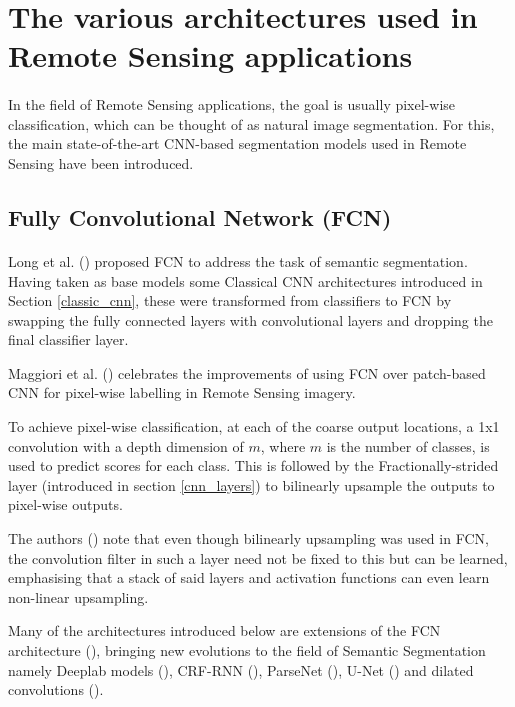 \section{The various architectures used in Remote Sensing applications} \label{seg_nets}
\paragraph{}
In the field of Remote Sensing applications, the goal is usually pixel-wise classification, which can be thought of as natural image segmentation. For this, the main state-of-the-art \gls{CNN}-based segmentation models used in Remote Sensing have been introduced.

\subsection{Fully Convolutional Network (FCN)} 
\paragraph{}
Long et al. (\cite{long2015fully}) proposed \gls{FCN} to address the task of semantic segmentation. Having taken as base models some Classical \gls{CNN} architectures introduced in Section \ref{classic_cnn}, these were transformed from classifiers to \gls{FCN} by swapping the fully connected layers with convolutional layers and dropping the final classifier layer. 

Maggiori et al. (\cite{7730322}) celebrates the improvements of using \gls{FCN} over patch-based \gls{CNN} for pixel-wise labelling in Remote Sensing imagery.

To achieve pixel-wise classification, at each of the coarse output locations, a 1x1 convolution with a depth dimension of $m$, where $m$ is the number of classes, is used to predict scores for each class. This is followed by the Fractionally-strided layer (introduced in section \ref{cnn_layers}) to bilinearly upsample the outputs to pixel-wise outputs. 

The authors (\cite{long2015fully}) note that even though bilinearly upsampling was used in \gls{FCN}, the convolution filter in such a layer need not be fixed to this but can be learned, emphasising that a stack of said layers and activation functions can even learn non-linear upsampling.

Many of the architectures introduced below are extensions of the \gls{FCN} architecture (\cite{long2015fully}), bringing new evolutions to the field of Semantic Segmentation namely Deeplab models (\cite{chen2017deeplab}), \gls{CRF}-\gls{RNN} (\cite{Zheng_2015}), ParseNet (\cite{liu2015parsenet}), U-Net (\cite{ronneberger2015unet}) and dilated convolutions (\cite{yu2016multiscale}).

